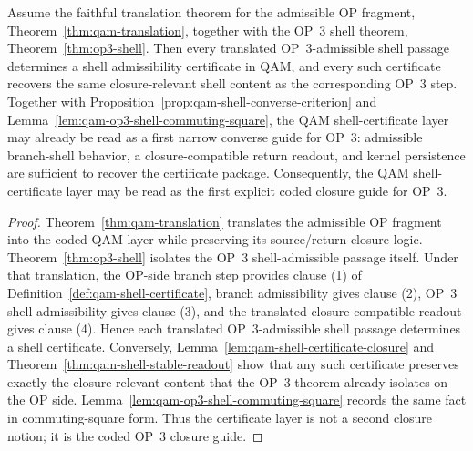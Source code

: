 \begin{theorem}\label{thm:qam-op3-shell-correspondence}
Assume the faithful translation theorem for the admissible OP fragment, Theorem~\ref{thm:qam-translation}, together with the OP~3 shell theorem, Theorem~\ref{thm:op3-shell}. Then every translated OP~3-admissible shell passage determines a shell admissibility certificate in QAM, and every such certificate recovers the same closure-relevant shell content as the corresponding OP~3 step. Together with Proposition~\ref{prop:qam-shell-converse-criterion} and Lemma~\ref{lem:qam-op3-shell-commuting-square}, the QAM shell-certificate layer may already be read as a first narrow converse guide for OP~3: admissible branch-shell behavior, a closure-compatible return readout, and kernel persistence are sufficient to recover the certificate package. Consequently, the QAM shell-certificate layer may be read as the first explicit coded closure guide for OP~3.
\end{theorem}

\begin{proof}
Theorem~\ref{thm:qam-translation} translates the admissible OP fragment into the coded QAM layer while preserving its source/return closure logic. Theorem~\ref{thm:op3-shell} isolates the OP~3 shell-admissible passage itself. Under that translation, the OP-side branch step provides clause (1) of Definition~\ref{def:qam-shell-certificate}, branch admissibility gives clause (2), OP~3 shell admissibility gives clause (3), and the translated closure-compatible readout gives clause (4). Hence each translated OP~3-admissible shell passage determines a shell certificate. Conversely, Lemma~\ref{lem:qam-shell-certificate-closure} and Theorem~\ref{thm:qam-shell-stable-readout} show that any such certificate preserves exactly the closure-relevant content that the OP~3 theorem already isolates on the OP side. Lemma~\ref{lem:qam-op3-shell-commuting-square} records the same fact in commuting-square form. Thus the certificate layer is not a second closure notion; it is the coded OP~3 closure guide.
\end{proof}

